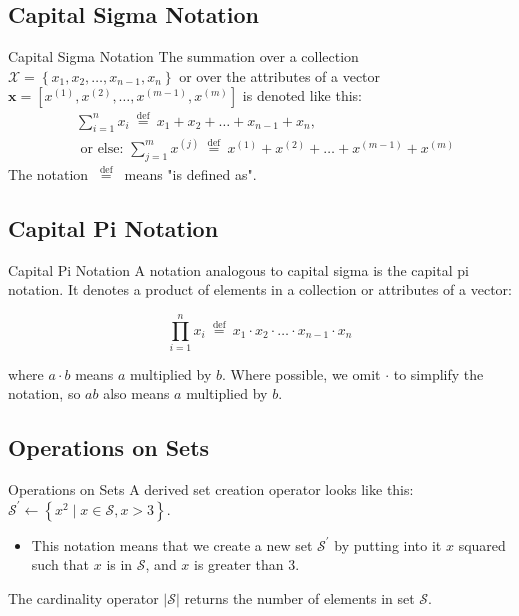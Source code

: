 \documentclass[9pt,dvipsnames]{beamer}
\begin{document}
\subsection{Capital Sigma Notation}
\begin{frame}{Capital Sigma Notation}
	The summation over a collection $\mathcal{X}=\left\{x_{1}, x_{2}, \ldots, x_{n-1}, x_{n}\right\}$ or over the attributes of a vector $\mathbf{x}=\left[x^{(1)}, x^{(2)}, \ldots, x^{(m-1)}, x^{(m)}\right]$ is denoted like this:
	\begin{equation*}
		\begin{aligned}
			 & \sum_{i=1}^{n} x_{i} \stackrel{\text { def }}{=} x_{1}+x_{2}+\ldots+x_{n-1}+x_{n}, \\ & \text { or else: } \sum_{j=1}^{m} x^{(j)} \stackrel{\text { def }}{=} x^{(1)}+x^{(2)}+\ldots+x^{(m-1)}+x^{(m)}
		\end{aligned}
	\end{equation*}
	The notation $\stackrel{\text { def }}{=}$ means "is defined as".
\end{frame}

\subsection{Capital Pi Notation}
\begin{frame}{Capital Pi Notation}
	A notation analogous to capital sigma is the capital pi notation. It denotes a product of elements in a collection or attributes of a vector:

	$$
		\prod_{i=1}^{n} x_{i} \stackrel{\text { def }}{=} x_{1} \cdot x_{2} \cdot \ldots \cdot x_{n-1} \cdot x_{n}
	$$

	where $a \cdot b$ means $a$ multiplied by $b$. Where possible, we omit $\cdot$ to simplify the notation, so $a b$ also means $a$ multiplied by $b$.
\end{frame}

\subsection{Operations on Sets}
\begin{frame}{Operations on Sets}
	A derived set creation operator looks like this: $\mathcal{S}^{\prime}\leftarrow\left\{x^{2} \mid x \in \mathcal{S}, x>3\right\}$.
	\begin{itemize}
		\item This notation means that we create a new set $\mathcal{S}^{\prime}$ by putting into it $x$ squared such that $x$ is in $\mathcal{S}$, and $x$ is greater than 3.
	\end{itemize}
	The cardinality operator $|\mathcal{S}|$ returns the number of elements in set $\mathcal{S}$.
\end{frame}
\end{document}

